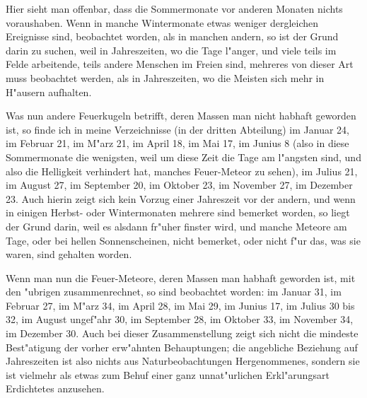 \documentclass[a4paper, 11pt, oneside, polutonikogreek, german]{article}
\begin{document}
Hier sieht man offenbar, dass die Sommermonate vor anderen Monaten nichts voraushaben. Wenn in manche Wintermonate etwas weniger dergleichen Ereignisse sind, beobachtet worden, als in manchen andern, so ist der Grund darin zu suchen, weil in Jahreszeiten, wo die Tage l"anger, und viele teils im Felde arbeitende, teils andere Menschen im Freien sind, mehreres von dieser Art muss beobachtet werden, als in Jahreszeiten, wo die Meisten sich mehr in H"ausern aufhalten.

Was nun andere Feuerkugeln betrifft, deren Massen man nicht habhaft geworden ist, so finde ich in meine Verzeichnisse (in der dritten Abteilung) im Januar 24, im Februar 21, im M"arz 21, im April 18, im Mai 17, im Junius 8 (also in diese Sommermonate die wenigsten, weil um diese Zeit die Tage am l"angsten sind, und also die Helligkeit verhindert hat, manches Feuer-Meteor zu sehen), im Julius 21, im August 27, im September 20, im Oktober 23, im November 27, im Dezember 23. Auch hierin zeigt sich kein Vorzug einer Jahreszeit vor der andern, und wenn in einigen Herbst- oder Wintermonaten mehrere sind bemerket worden, so liegt der Grund darin, weil es alsdann fr"uher finster wird, und manche Meteore am Tage, oder bei hellen Sonnenscheinen, nicht bemerket, oder nicht f"ur das, was sie waren, sind gehalten worden.

Wenn man nun die Feuer-Meteore, deren Massen man habhaft geworden ist, mit den "ubrigen zusammenrechnet, so sind beobachtet worden: im Januar 31, im Februar 27, im M"arz 34, im April 28, im Mai 29, im Junius 17, im Julius 30 bis 32, im August ungef"ahr 30, im September 28, im Oktober 33, im November 34, im Dezember 30. Auch bei dieser Zusammenstellung zeigt sich nicht die mindeste Best"atigung der vorher erw"ahnten Behauptungen; die angebliche Beziehung auf Jahreszeiten ist also nichts aus Naturbeobachtungen Hergenommenes, sondern sie ist vielmehr als etwas zum Behuf einer ganz unnat"urlichen Erkl"arungsart Erdichtetes anzusehen.
\subsection{}
\end{document}

